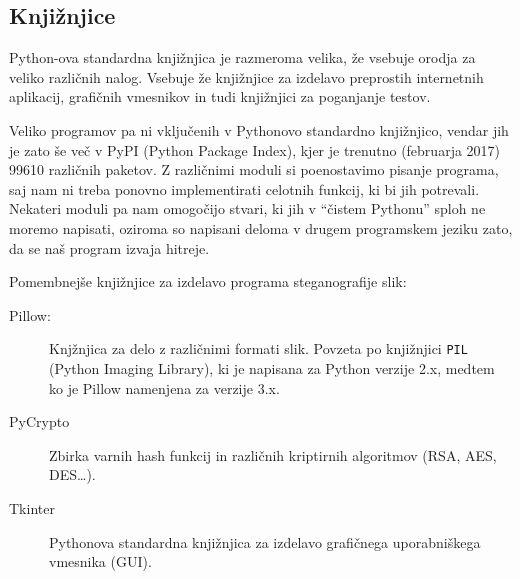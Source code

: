\subsection{Knjižnjice}
    Python-ova standardna knjižnjica je razmeroma velika, že vsebuje orodja za veliko različnih nalog. Vsebuje že knjižnjice za izdelavo preprostih internetnih aplikacij, grafičnih vmesnikov in tudi knjižnjici za poganjanje testov.

    Veliko programov pa ni vključenih v Pythonovo standardno knjižnjico, vendar jih je zato še več v PyPI (Python Package Index), kjer je trenutno (februarja 2017) 99610 različnih paketov. Z različnimi moduli si poenostavimo pisanje programa, saj nam ni treba ponovno implementirati celotnih funkcij, ki bi jih potrevali. Nekateri moduli pa nam omogočijo stvari, ki jih v ``čistem Pythonu'' sploh ne moremo napisati, oziroma so napisani deloma v drugem programskem jeziku zato, da se naš program izvaja hitreje.

    Pomembnejše knjižnjice za izdelavo programa steganografije slik:
    \begin{description}
        \item [Pillow:] Knjžnjica za delo z različnimi formati slik. Povzeta po knjižnjici \texttt{PIL} (Python Imaging Library), ki je napisana za Python verzije 2.x, medtem ko je Pillow namenjena za verzije 3.x.
        \item [PyCrypto] Zbirka varnih hash funkcij in različnih kriptirnih algoritmov (RSA, AES, DES\ldots).
        \item [Tkinter] Pythonova standardna knjižnjica za izdelavo grafičnega uporabniškega vmesnika (GUI).
    \end{description}
